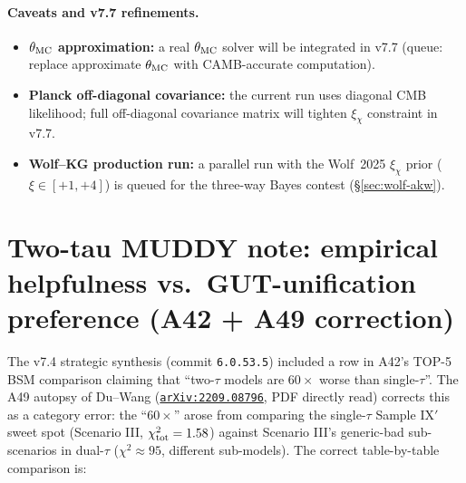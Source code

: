 \documentclass[a4paper,11pt]{article}
\newcommand{\arXiv}[1]{\href{https://arxiv.org/abs/#1}{\texttt{arXiv:#1}}}
\theoremstyle{definition}
\theoremstyle{remark}
\begin{document}
\paragraph{Caveats and v7.7 refinements.}
\begin{itemize}
  \item \textbf{$\theta_{\rm MC}$ approximation:} a real $\theta_{\rm MC}$
    solver will be integrated in v7.7 (queue: replace approximate
    $\theta_{\rm MC}$ with CAMB-accurate computation).
  \item \textbf{Planck off-diagonal covariance:} the current run
    uses diagonal CMB likelihood; full off-diagonal covariance
    matrix will tighten $\xi_\chi$ constraint in v7.7.
  \item \textbf{Wolf--KG production run:} a parallel run with the
    Wolf~2025 $\xi_\chi$ prior ($\xi\in[+1,+4]$) is queued for
    the three-way Bayes contest (\S\ref{sec:wolf-akw}).
\end{itemize}

\section{Two-tau MUDDY note: empirical helpfulness vs.\
         GUT-unification preference (A42 + A49 correction)}
\label{sec:two-tau}

The v7.4 strategic synthesis (commit \texttt{6.0.53.5})
included a row in A42's TOP-5 BSM comparison claiming that
``two-$\tau$ models are $60\times$ worse than single-$\tau$''.
The A49 autopsy of Du--Wang \cite{DuWang22} (\arXiv{2209.08796},
PDF directly read) corrects this as a category error: the
``$60\times$'' arose from comparing the single-$\tau$ Sample
IX$'$ sweet spot (Scenario III, $\chi^2_{\rm tot}=1.58$) against
Scenario III's generic-bad sub-scenarios in dual-$\tau$
($\chi^2\approx 95$, different sub-models).  The correct
table-by-table comparison is:
\end{document}
